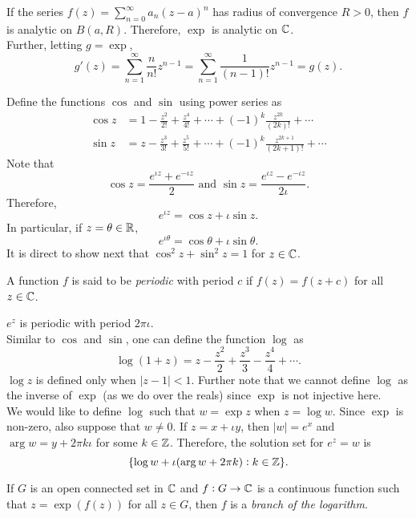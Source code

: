	If the series $f(z) = \sum_{n=0}^\infty a_n (z-a)^n$ has radius of convergence $R > 0$, then $f$ is analytic on $B(a,R)$. Therefore, $\exp$ is analytic on $\mathbb{C}$.\\
	Further, letting $g = \exp$,
	\[ g'(z) = \sum_{n=1}^\infty \frac{n}{n!} z^{n-1} = \sum_{n=1}^\infty \frac{1}{(n-1)!} z^{n-1} = g(z). \]

	Define the functions $\cos$ and $\sin$ using power series as
	\begin{align*}
		\cos z &= 1 - \frac{z^2}{2!} + \frac{z^4}{4!} + \cdots + (-1)^k \frac{z^{2k}}{(2k)!} + \cdots \\
		\sin z &= z - \frac{z^3}{3!} + \frac{z^5}{5!} + \cdots + (-1)^k \frac{z^{2k+1}}{(2k+1)!} + \cdots
	\end{align*}
	Note that
	\[ \cos z = \frac{e^{\iota z} + e^{-\iota z}}{2} \text{ and } \sin z = \frac{e^{\iota z} - e^{-\iota z}}{2\iota}. \]
	Therefore,
	\[ e^{\iota z} = \cos z + \iota \sin z. \]
	In particular, if $z = \theta \in \mathbb{R}$,
	\[ e^{\iota \theta} = \cos \theta + \iota \sin \theta. \]
	It is direct to show next that $\cos^2 z + \sin^2 z = 1$ for $z \in \mathbb{C}$.

	\begin{definition}
		A function $f$ is said to be \emph{periodic} with period $c$ if $f(z) = f(z+c)$ for all $z\in\mathbb{C}$.
	\end{definition}

	$e^{z}$ is periodic with period $2\pi\iota$.\\

	Similar to $\cos$ and $\sin$, one can define the function $\log$ as
	\[ \log (1 + z) = z - \frac{z^2}{2} + \frac{z^3}{3} - \frac{z^4}{4} + \cdots. \]
	$\log z$ is defined only when $|z-1| < 1$. Further note that we cannot define $\log$ as the inverse of $\exp$ (as we do over the reals) since $\exp$ is not injective here.\\
	We would like to define $\log$ such that $w = \exp z$ when $z = \log w$. Since $\exp$ is non-zero, also suppose that $w \ne 0$. If $z = x + \iota y$, then $|w| = e^x$ and $\arg w = y + 2\pi k\iota$ for some $k\in\mathbb{Z}$. Therefore, the solution set for $e^z = w$ is
	\[ \{ \log w + \iota (\arg w + 2\pi k) : k \in \mathbb{Z} \}. \]

	\begin{fdef}
		If $G$ is an open connected set in $\mathbb{C}$ and $f : G \to \mathbb{C}$ is a continuous function such that $z = \exp(f(z))$ for all $z \in G$, then $f$ is a \emph{branch of the logarithm}.
	\end{fdef}

